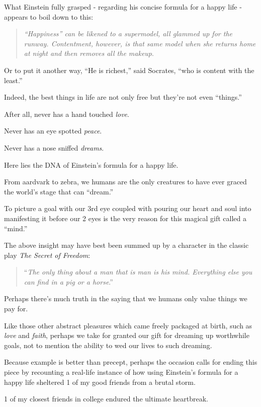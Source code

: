 \documentclass{article}
\begin{document}
%
What Einstein fully grasped - regarding his concise formula for a happy life - appears to boil down to this:

\begin{quotation}
	\textit{``Happiness'' can be likened to a supermodel, all glammed up for the runway. Contentment, however, is that same model when she returns home at night and then removes all the makeup}.
\end{quotation}
Or to put it another way, ``He is richest,'' said Socrates, ``who is content with the least.''

%
Indeed, the best things in life are not only free but they're not even ``things.''

After all, never has a hand touched \textit{love}.

Never has an eye spotted \textit{peace}.

Never has a nose sniffed \textit{dreams}.

Here lies the DNA of Einstein's formula for a happy life.

%
From aardvark to zebra, we humans are the only creatures to have ever graced the world's stage that can ``dream.''

To picture a goal with our 3rd eye coupled with pouring our heart and soul into manifesting it before our 2 eyes is the very reason for this magical gift called a ``mind.''

%
The above insight may have best been summed up by a character in the classic play \textit{The Secret of Freedom}:

\begin{quotation}
	``\textit{The only thing about a man that is man is his mind. Everything else you can find in a pig or a horse}.''
\end{quotation}
Perhaps there's much truth in the saying that we humans only value things we pay for.

%
Like those other abstract pleasures which came freely packaged at birth, such as \textit{love} and \textit{faith}, perhaps we take for granted our gift for dreaming up worthwhile goals, not to mention the ability to wed our lives to such dreaming.

%
Because example is better than precept, perhaps the occasion calls for ending this piece by recounting a real-life instance of how using Einstein's formula for a happy life sheltered 1 of my good friends from a brutal storm.

%
1 of my closest friends in college endured the ultimate heartbreak.
\end{document}
